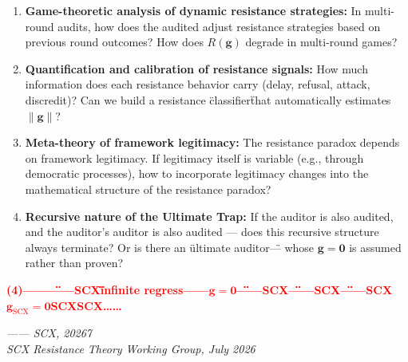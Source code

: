 \documentclass[12pt,a4paper]{article}
\theoremstyle{remark}
\newcommand{\g}{\mathbf{g}}
\newcommand{\honestcrit}[1]{%
    \textcolor{red}{\textbf{#1}}%
}
\begin{document}
\begin{enumerate}[label=(\arabic*)]
    \item \textbf{Game-theoretic analysis of dynamic resistance strategies:} In multi-round audits, how does the audited adjust resistance strategies based on previous round outcomes? How does $ R(\g) $ degrade in multi-round games?
    
    \item \textbf{Quantification and calibration of resistance signals:} How much information does each resistance behavior carry (delay, refusal, attack, discredit)? Can we build a resistance \"classifier\" that automatically estimates $ \| \g \| $?
    
    \item \textbf{Meta-theory of framework legitimacy:} The resistance paradox depends on framework legitimacy. If legitimacy itself is variable (e.g., through democratic processes), how to incorporate legitimacy changes into the mathematical structure of the resistance paradox?
    
    \item \textbf{Recursive nature of the Ultimate Trap:} If the auditor is also audited, and the auditor's auditor is also audited — does this recursive structure always terminate? Or is there an \"ultimate auditor\" — whose $ \g = \mathbf{0} $ is assumed rather than proven?
\end{enumerate}

\honestcrit{(4)——\"\"——SCX\"\"infinite regress——$ \g = \mathbf{0} $\"\"——SCX\"\"——SCX\"\"——SCX$ \g_{\text{SCX}} = \mathbf{0} $SCXSCX……}

\vspace{12pt}
\begin{flushright}
\textit{—— SCX, 20267}\\
\textit{SCX Resistance Theory Working Group, July 2026}
\end{flushright}
\end{document}
